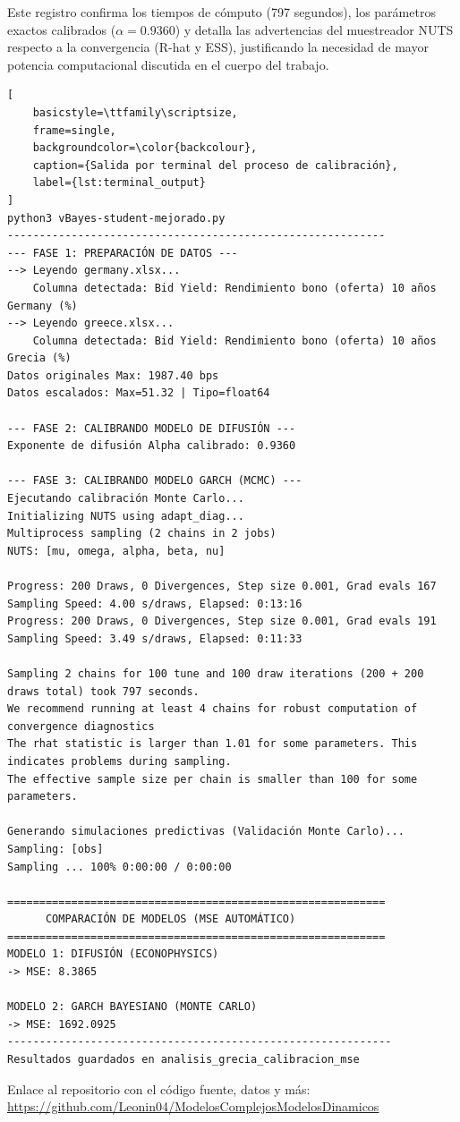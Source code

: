 Este registro confirma los tiempos de cómputo (797 segundos), los parámetros exactos calibrados ($\alpha=0.9360$) y detalla las advertencias del muestreador NUTS respecto a la convergencia (R-hat y ESS), justificando la necesidad de mayor potencia computacional discutida en el cuerpo del trabajo.

\begin{lstlisting}[
    basicstyle=\ttfamily\scriptsize, 
    frame=single, 
    backgroundcolor=\color{backcolour}, 
    caption={Salida por terminal del proceso de calibración},
    label={lst:terminal_output}
]
python3 vBayes-student-mejorado.py
-----------------------------------------------------------
--- FASE 1: PREPARACIÓN DE DATOS ---
--> Leyendo germany.xlsx...
    Columna detectada: Bid Yield: Rendimiento bono (oferta) 10 años Germany (%)
--> Leyendo greece.xlsx...
    Columna detectada: Bid Yield: Rendimiento bono (oferta) 10 años Grecia (%)
Datos originales Max: 1987.40 bps
Datos escalados: Max=51.32 | Tipo=float64

--- FASE 2: CALIBRANDO MODELO DE DIFUSIÓN ---
Exponente de difusión Alpha calibrado: 0.9360

--- FASE 3: CALIBRANDO MODELO GARCH (MCMC) ---
Ejecutando calibración Monte Carlo...
Initializing NUTS using adapt_diag...
Multiprocess sampling (2 chains in 2 jobs)
NUTS: [mu, omega, alpha, beta, nu]

Progress: 200 Draws, 0 Divergences, Step size 0.001, Grad evals 167
Sampling Speed: 4.00 s/draws, Elapsed: 0:13:16
Progress: 200 Draws, 0 Divergences, Step size 0.001, Grad evals 191
Sampling Speed: 3.49 s/draws, Elapsed: 0:11:33

Sampling 2 chains for 100 tune and 100 draw iterations (200 + 200 draws total) took 797 seconds.
We recommend running at least 4 chains for robust computation of convergence diagnostics
The rhat statistic is larger than 1.01 for some parameters. This indicates problems during sampling.
The effective sample size per chain is smaller than 100 for some parameters.

Generando simulaciones predictivas (Validación Monte Carlo)...
Sampling: [obs]
Sampling ... 100% 0:00:00 / 0:00:00

===========================================================
      COMPARACIÓN DE MODELOS (MSE AUTOMÁTICO)
===========================================================
MODELO 1: DIFUSIÓN (ECONOPHYSICS)
-> MSE: 8.3865

MODELO 2: GARCH BAYESIANO (MONTE CARLO)
-> MSE: 1692.0925
------------------------------------------------------------
Resultados guardados en analisis_grecia_calibracion_mse
\end{lstlisting}

Enlace al repositorio con el código fuente, datos y más: \url{https://github.com/Leonin04/ModelosComplejosModelosDinamicos}